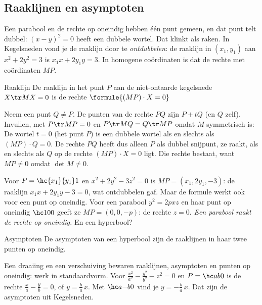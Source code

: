 \begin{oefeningen}
\end{oefeningen}

\subsection{Raaklijnen en asymptoten}

Een parabool en de rechte op oneindig hebben één punt gemeen, en dat punt telt dubbel: $(x - y)^2 = 0$ heeft een dubbele wortel. Dat klinkt als raken. In Kegelsneden vond je de raaklijn door te \emph{ontdubbelen}: de raaklijn in $(x_1, y_1)$ aan $x^2 + 2y^2 = 3$ is $x_1x + 2y_1y = 3$. In homogene coördinaten is dat de rechte met coördinaten $MP$.

\begin{theorie}
\begin{stelling}{Raaklijn}
De raaklijn in het punt $P$ aan de niet-ontaarde kegelsnede $X\tr MX = 0$ is de rechte \qquad $\formule{(MP) \cdot X = 0}$
\end{stelling}

\begin{bewijs}
Neem een punt $Q \neq P$. De punten van de rechte $PQ$ zijn $P + tQ$ (en $Q$ zelf). Invullen, met $P\tr MP = 0$ en $P\tr MQ = Q\tr MP$ omdat $M$ symmetrisch is:
De wortel $t = 0$ (het punt $P$) is een dubbele wortel als en slechts als $(MP) \cdot Q = 0$. De rechte $PQ$ heeft dus alleen $P$ als dubbel snijpunt, ze raakt, als en slechts als $Q$ op de rechte $(MP) \cdot X = 0$ ligt. Die rechte bestaat, want $MP \neq 0$ omdat $\det M \neq 0$.
\end{bewijs}
\end{theorie}

Voor $P = \hc{x_1}{y_1}1$ en $x^2 + 2y^2 - 3z^2 = 0$ is $MP = (x_1, 2y_1, -3)$: de raaklijn $x_1x + 2y_1y - 3 = 0$, wat ontdubbelen gaf. Maar de formule werkt ook voor een punt op oneindig. Voor een parabool $y^2 = 2pxz$ en haar punt op oneindig $\hc100$ geeft ze $MP = (0, 0, -p)$: de rechte $z = 0$. \textit{Een parabool raakt de rechte op oneindig.} En een hyperbool?

\begin{theorie}
\begin{stelling}{Asymptoten}
De asymptoten van een hyperbool zijn de raaklijnen in haar twee punten op oneindig.
\end{stelling}

\begin{bewijs}
Een draaiing en een verschuiving bewaren raaklijnen, asymptoten en punten op oneindig: werk in standaardvorm. Voor $\tfrac{x^2}{a^2} - \tfrac{y^2}{b^2} - z^2 = 0$ en $P = \hc ab0$ is
de rechte $\tfrac xa - \tfrac yb = 0$, of $y = \tfrac ba\,x$. Met $\hc a{-b}0$ vind je $y = -\tfrac ba\,x$. Dat zijn de asymptoten uit Kegelsneden.
\end{bewijs}
\end{theorie}

